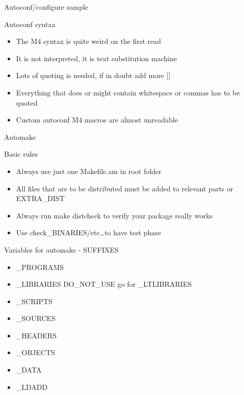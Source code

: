 \documentclass{beamer}
\begin{document}
\begin{frame}[t]{Autoconf/configure sample}
	\begin{small}
	
	\end{small}
\end{frame}

\begin{frame}{Autoconf syntax}
    \begin{itemize}
    \item The M4 syntax is quite weird on the first read
    \item It is not interpreted, it is text substitution machine
    \item Lots of quoting is needed, if in doubt add more []
    \item Everything that does or might contain whitespace or commas has to be quoted
    \item Custom autoconf M4 macros are almost unreadable
    \end{itemize}
\end{frame}

\begin{frame}[t]{Automake}
	\begin{small}
	
	\end{small}
\end{frame}

\begin{frame}{Basic rules}
    \begin{itemize}
    \item Always use just one Makefile.am in root folder
    \item All files that are to be distributed must be added to relevant parts or EXTRA\_DIST
    \item Always run make distcheck to verify your package really works
    \item Use check\_BINARIES/etc\ldots to have test phase
    \end{itemize}
\end{frame}

\begin{frame}{Variables for automake - SUFFIXES}
    \begin{itemize}
    \item \_PROGRAMS
    \item \_LIBRARIES DO\_NOT\_USE go for \_LTLIBRARIES
    \item \_SCRIPTS
    \item \_SOURCES
    \item \_HEADERS
    \item \_OBJECTS
    \item \_DATA
    \item \_LDADD
    \end{itemize}
\end{frame}
\end{document}
